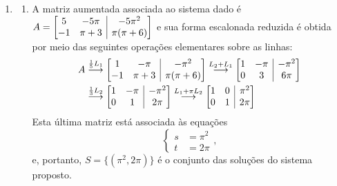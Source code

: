\documentclass[12pt,a4paper]{article}
\makeatletter
\newenvironment{amatrix}[1]{%
  \left[\begin{array}{@{}*{#1}{c}|c@{}}
}{%
  \end{array}\right]
}
\newcommand{\grstep}[2][\relax]{%
   \ensuremath{\mathrel{
       {\mathop{\longrightarrow}\limits^{#2\mathstrut}_{
                                     \begin{subarray}{l} #1 \end{subarray}}}}}}
\makeatother
\begin{document}
\begin{enumerate}
\item \begin{enumerate}
\item A matriz aumentada associada ao sistema dado é $A = \begin{amatrix}{2}
 5 & -5\pi & -5\pi^2 \\
-1 & \pi+3 & \pi(\pi + 6)
\end{amatrix}$
e sua forma escalonada reduzida é obtida por meio das seguintes operações elementares sobre as linhas:
\begin{align*}
A
&
\grstep{ \frac{1}{5} L_1 }
\begin{amatrix}{2}
 1 & -\pi & -\pi^2 \\
-1 & \pi+3 & \pi(\pi + 6)
\end{amatrix}
\grstep{ L_2 + L_1 }
\begin{amatrix}{2}
 1 & -\pi & -\pi^2 \\
 0 &    3 & 6\pi
\end{amatrix} \\
&
\grstep{ \frac{1}{3} L_2 }
\begin{amatrix}{2}
 1 & -\pi & -\pi^2 \\
 0 &    1 & 2\pi
\end{amatrix}
\grstep{ L_1 + \pi L_2 }
\begin{amatrix}{2}
 1 & 0 & \pi^2 \\
 0 & 1 & 2\pi
\end{amatrix}
\end{align*}
Esta última matriz está associada às equações
\[
\left\{
\begin{aligned}
s & = \pi^2 \\
t & = 2\pi
\end{aligned}
\right.,
\]
e, portanto, $S = \{ ( \pi^2, 2\pi ) \}$ é o conjunto das soluções do sistema proposto.


\end{enumerate}
\end{enumerate}
\end{document}
